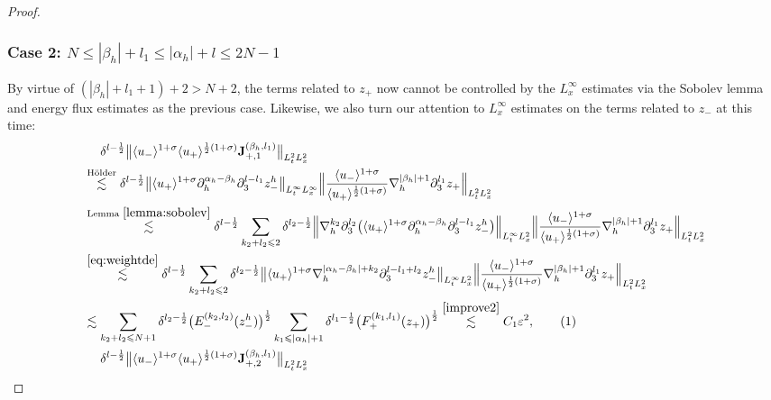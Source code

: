\documentclass[10pt,reqno]{amsart}
\numberwithin{equation}{section}
\begin{document}
\begin{proof}
	\subsubsection*{\bf Case 2:  $N\leqslant|\beta_h|+l_1\leqslant |\alpha_h|+l\leqslant 2N-1$}
	By virtue of 
	$(|\beta_h|+l_1+1)+2> N+2$, 
	the terms related to $z_+$ now
	cannot be controlled by the $L^\infty_x$ estimates via the  Sobolev lemma and energy flux estimates as the previous case. Likewise, we also turn our attention to $L^\infty_x$ estimates on the terms related to $z_-$ at this time:
	\begin{align*}
		&\ \ \ \ \delta^{l-\frac{1}{2}}	\big\|\langle u_-\rangle^{1+\sigma}\langle u_+\rangle^{\frac{1}{2}(1+\sigma)}\mathbf{J}_{+,1}^{(\beta_h,l_1)}\big\|_{L^2_tL^2_x}\\
		&\stackrel{\text{H\"older}}{\lesssim}\delta^{l-\frac{1}{2}}\big\|\langle u_+\rangle^{1+\sigma}\partial_h^{\alpha_h-\beta_h}\partial_3^{l-l_1}z_-^h\big\|_{L^\infty_tL^\infty_x}\Big\|\frac{\langle u_-\rangle^{1+\sigma}}{\langle u_+\rangle^{\frac{1}{2}(1+\sigma)}}\nabla_h^{|\beta_h|+1}\partial_3^{l_1} z_{+}\Big\|_{L^2_tL^2_x}\\
		& \stackrel{\text{Lemma } \ref{lemma:sobolev}}{\lesssim} \delta^{l-\frac{1}{2}}\sum_{k_2+l_2\leqslant 2}\delta^{l_2-\frac{1}{2}}\Big\|\nabla_h^{k_2}\partial_3^{l_2}\big(\langle u_+\rangle^{1+\sigma}\partial_h^{\alpha_h-\beta_h}\partial_3^{l-l_1}z_-^h\big)\Big\|_{L^\infty_tL^2_x}\Big\|\frac{\langle u_-\rangle^{1+\sigma}}{\langle u_+\rangle^{\frac{1}{2}(1+\sigma)}}\nabla_h^{|\beta_h|+1}\partial_3^{l_1} z_{+}\Big\|_{L^2_tL^2_x}\\
		&\stackrel{\eqref{eq:weightde}}{\lesssim} \delta^{l-\frac{1}{2}}\sum_{k_2+l_2\leqslant 2}\delta^{l_2-\frac{1}{2}}\big\|\langle u_+\rangle^{1+\sigma}\nabla_h^{|\alpha_h-\beta_h|+k_2}\partial_3^{l-l_1+l_2}z_-^h\big\|_{L^\infty_tL^2_x}\Big\|\frac{\langle u_-\rangle^{1+\sigma}}{\langle u_+\rangle^{\frac{1}{2}(1+\sigma)}}\nabla_h^{|\beta_h|+1}\partial_3^{l_1} z_{+}\Big\|_{L^2_tL^2_x}\\
		&\lesssim \sum_{k_2+l_2\leqslant N+1}\delta^{l_2-\frac{1}{2}} \big(E_-^{(k_2,l_2)}(z_-^h)\big)^{\frac{1}{2}}\sum_{k_1\leqslant|\alpha_h|+1}\delta^{l_1-\frac{1}{2}} \big(F_+^{(k_1,l_1)}(z_+)\big)^{\frac{1}{2}}
		\stackrel{\eqref{improve2}}{\lesssim} C_1\varepsilon^2,\stepcounter{equation}\tag{\theequation}\label{eqA3}\\
		&\ \ \ \ 	\delta^{l-\frac{1}{2}}\big\|\langle u_-\rangle^{1+\sigma}\langle u_+\rangle^{\frac{1}{2}(1+\sigma)}\mathbf{J}_{+,2}^{(\beta_h,l_1)}\big\|_{L^2_tL^2_x}\\

\end{align*}
\end{proof}
\end{document}

